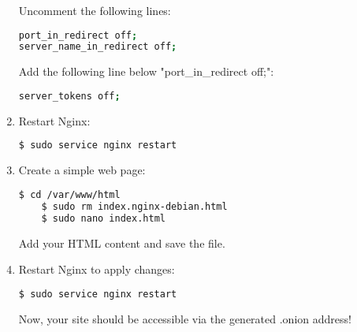 \begin{enumerate}
Uncomment the following lines:
\begin{lstlisting}[language=bash, breaklines=true, breakatwhitespace=true, columns=fullflexible]
port_in_redirect off;
server_name_in_redirect off;
\end{lstlisting}

Add the following line below "port\_in\_redirect off;":
\begin{lstlisting}[language=bash, breaklines=true, breakatwhitespace=true, columns=fullflexible]
server_tokens off;
\end{lstlisting}

    \item Restart Nginx:
    \begin{lstlisting}[language=bash, breaklines=true, breakatwhitespace=true, columns=fullflexible]
    $ sudo service nginx restart
    \end{lstlisting}

    \item Create a simple web page:
    \begin{lstlisting}[language=bash, breaklines=true, breakatwhitespace=true, columns=fullflexible]
    $ cd /var/www/html
    $ sudo rm index.nginx-debian.html
    $ sudo nano index.html
    \end{lstlisting}
    Add your HTML content and save the file.

\item Restart Nginx to apply changes:
\begin{lstlisting}[language=bash, breaklines=true, breakatwhitespace=true, columns=fullflexible]
$ sudo service nginx restart
\end{lstlisting}
Now, your site should be accessible via the generated .onion address!
   
\end{enumerate}